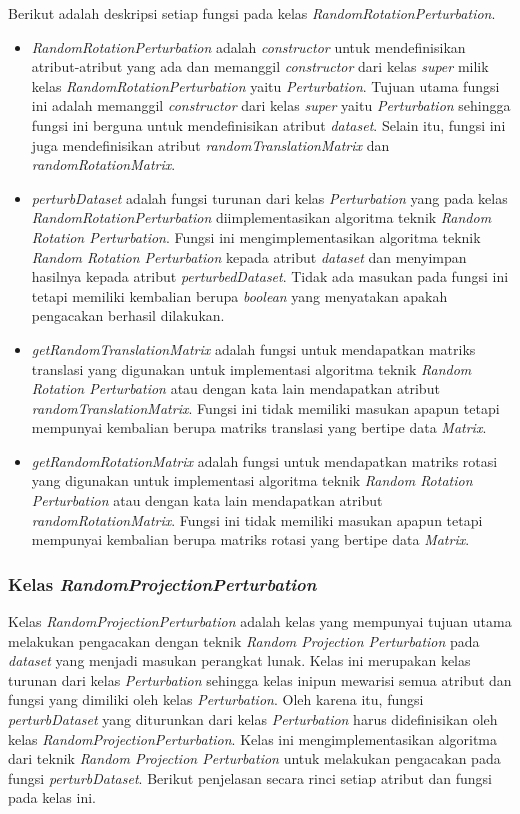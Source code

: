 Berikut adalah deskripsi setiap fungsi pada kelas \textit{RandomRotationPerturbation}.
\begin{itemize}
	\item \textit{RandomRotationPerturbation} adalah \textit{constructor} untuk mendefinisikan atribut-atribut yang ada dan memanggil \textit{constructor} dari kelas \textit{super} milik kelas \textit{RandomRotationPerturbation} yaitu \textit{Perturbation}. Tujuan utama fungsi ini adalah memanggil \textit{constructor} dari kelas \textit{super} yaitu \textit{Perturbation} sehingga fungsi ini berguna untuk mendefinisikan atribut \textit{\textit{dataset}}. Selain itu, fungsi ini juga mendefinisikan atribut \textit{randomTranslationMatrix} dan \textit{randomRotationMatrix}.
	\item \textit{perturbDataset} adalah fungsi turunan dari kelas \textit{Perturbation} yang pada kelas \textit{RandomRotationPerturbation} diimplementasikan algoritma teknik \textit{Random Rotation Perturbation}. Fungsi ini mengimplementasikan algoritma teknik \textit{Random Rotation Perturbation} kepada atribut \textit{\textit{dataset}} dan menyimpan hasilnya kepada atribut \textit{perturbedDataset}. Tidak ada masukan pada fungsi ini tetapi memiliki kembalian berupa \textit{boolean} yang menyatakan apakah pengacakan berhasil dilakukan.
	\item \textit{getRandomTranslationMatrix} adalah fungsi untuk mendapatkan matriks translasi yang digunakan untuk implementasi algoritma teknik \textit{Random Rotation Perturbation} atau dengan kata lain mendapatkan atribut \textit{randomTranslationMatrix}. Fungsi ini tidak memiliki masukan apapun tetapi mempunyai kembalian berupa matriks translasi yang bertipe data \textit{Matrix}.
	\item \textit{getRandomRotationMatrix} adalah fungsi untuk mendapatkan matriks rotasi yang digunakan untuk implementasi algoritma teknik \textit{Random Rotation Perturbation} atau dengan kata lain mendapatkan atribut \textit{randomRotationMatrix}. Fungsi ini tidak memiliki masukan apapun tetapi mempunyai kembalian berupa matriks rotasi yang bertipe data \textit{Matrix}.
\end{itemize}

\subsubsection{Kelas \textit{RandomProjectionPerturbation}}
\label{subsubsec:kelas-rpp}

Kelas \textit{RandomProjectionPerturbation} adalah kelas yang mempunyai tujuan utama melakukan pengacakan dengan teknik \textit{Random Projection Perturbation} pada \textit{dataset} yang menjadi masukan perangkat lunak. Kelas ini merupakan kelas turunan dari kelas \textit{Perturbation} sehingga kelas inipun mewarisi semua atribut dan fungsi yang dimiliki oleh kelas \textit{Perturbation}. Oleh karena itu, fungsi \textit{perturbDataset} yang diturunkan dari kelas \textit{Perturbation} harus didefinisikan oleh kelas \textit{RandomProjectionPerturbation}. Kelas ini mengimplementasikan algoritma dari teknik \textit{Random Projection Perturbation} untuk melakukan pengacakan pada fungsi \textit{perturbDataset}. Berikut penjelasan secara rinci setiap atribut dan fungsi pada kelas ini.

